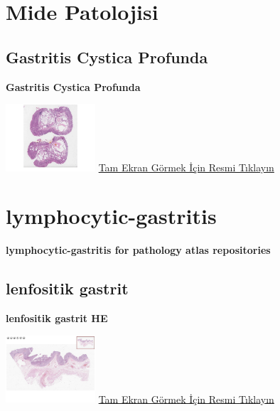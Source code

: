 \documentclass[
  letterpaper,
  DIV=11,
  numbers=noendperiod]{scrreprt}
\begin{document}
\hypertarget{sec-mide-patolojisi}{%
\chapter{Mide Patolojisi}\label{sec-mide-patolojisi}}

\hypertarget{sec-gastritis-cystica-profunda}{%
\section{Gastritis Cystica
Profunda}\label{sec-gastritis-cystica-profunda}}

\textbf{Gastritis Cystica Profunda}

\href{https://images.patolojiatlasi.com/gastritis-cystica-profunda/HE.html}{\includegraphics[width=0.25\textwidth,height=\textheight]{./screenshots/gastritis-cystica-profunda_screenshot.png}}
\href{https://images.patolojiatlasi.com/gastritis-cystica-profunda/HE.html}{Tam
Ekran Görmek İçin Resmi Tıklayın}

\hypertarget{lymphocytic-gastritis}{%
\chapter{lymphocytic-gastritis}\label{lymphocytic-gastritis}}

\textbf{lymphocytic-gastritis for pathology atlas repositories}

\hypertarget{sec-lymphocytic-gastritis}{%
\section{lenfositik gastrit}\label{sec-lymphocytic-gastritis}}

\textbf{lenfositik gastrit HE}

\href{https://images.patolojiatlasi.com/lymphocytic-gastritis/HE.html}{\includegraphics[width=0.25\textwidth,height=\textheight]{./screenshots/lymphocytic-gastritisHE_screenshot.png}}
\href{https://images.patolojiatlasi.com/lymphocytic-gastritis/HE.html}{Tam
Ekran Görmek İçin Resmi Tıklayın}
\end{document}
